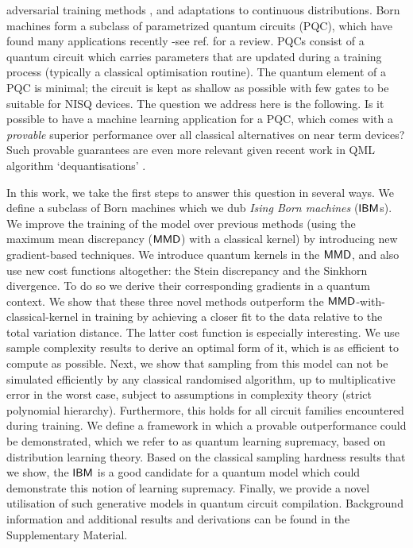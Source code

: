 adversarial training methods \cite{zeng_learning_2018}, and adaptations to continuous distributions\cite{romero_variational_2019}. Born machines form a subclass of parametrized  
quantum circuits (PQC), which have found many applications recently -see ref. \cite{benedetti_parameterized_2019} for a review. PQCs consist of a quantum circuit which carries parameters that are updated during a training process (typically a classical optimisation routine). The quantum element of a PQC is minimal; the circuit is kept as shallow as possible with few gates to be suitable for NISQ devices. The question we address here is the following. Is it possible to have a machine learning application for a PQC, which comes with a \textit{provable} superior performance over all classical alternatives on near term devices? Such provable guarantees are even more relevant given recent work in QML algorithm `dequantisations' \cite{tang_quantum-inspired_2018, tang_quantum-inspired_2018-1, andoni_solving_2018, chia_quantum-inspired_2018, gilyen_quantum-inspired_2018}. 

In this work, we take the first steps to answer this question in several ways. We define a subclass of Born machines which we dub \emph{Ising Born machines} ($\textsf{IBM}$s). We improve the training of the model over previous methods (using the maximum mean discrepancy\cite{liu_differentiable_2018} ($\operatorname{\textsf{MMD}}$) with a classical kernel) by introducing new gradient-based techniques. We introduce quantum kernels in the $\operatorname{\textsf{MMD}}$, and also use new cost functions altogether: the Stein discrepancy and the Sinkhorn divergence. To do so we derive their corresponding gradients in a quantum context. We show that these three novel methods outperform the 
$\operatorname{\textsf{MMD}}$-with-classical-kernel in training by achieving a closer fit to the data relative to the total variation distance. The latter cost function is especially interesting. We use sample complexity results to derive an optimal form of it, which is as efficient to compute as possible. Next, we show that sampling from this model can not be simulated efficiently by any classical randomised algorithm, up to multiplicative error in the worst case, subject to assumptions in complexity theory (strict polynomial hierarchy). Furthermore, this holds for all circuit families encountered during training. We define a framework in which a provable outperformance could be demonstrated, which we refer to as quantum learning supremacy, based on distribution learning theory\cite{kearns_learnability_1994}. Based on the classical sampling hardness results that we show, the $\textsf{IBM}$ is a good candidate for a quantum model which could demonstrate this notion of learning supremacy. Finally, we provide a novel utilisation of such generative models in quantum circuit compilation. Background information and additional results and derivations can be found in the Supplementary Material.



